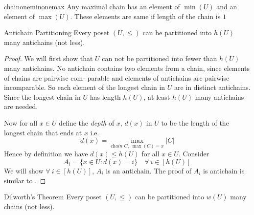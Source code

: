 \begin{lemma}{}{chainoneminonemax}
	Any maximal chain has an element of $\min(U)$ and an element of $\max(U)$. These elements are same if length of the chain is $1$
\end{lemma}
\begin{Theorem}{Antichain Partitioning}{}
	Every poset $(U,\leq )$ can be partitioned into $h(U)$ many antichains (not less). 
\end{Theorem}
\begin{proof}
	We will first show that $U$ can not be partitioned into fewer than $h(U)$ many antichains. No antichain contains two elements from a chain,  since elements of chains are pairwise com-
	parable and elements of antichains are pairwise incomparable. So each element of the longest chain in $U$ are in distinct antichains. Since the longest chain in $U$ has length $h(U)$, at least $h(U)$ many antichains are needed.
	
	Now for all $x\in U$ define the \textit{depth} of $x$, $d(x)$ in $U$ to be the length of the longest chain that ends at $x$ i.e. $$d(x)=\max\limits_{\textit{chain $C$},\; \max(C)=x}|C|$$Hence by definition we have $d(x)\leq h(U)$ for all $x\in U$. Consider $$A_i=\{x\in U\colon d(x)=i\}\quad\forall\ i\in[h(U)]$$We will show $\forall\ i\in[h(U)]$, $A_i$ is an antichain. The proof of $A_i$ is antichain is similar to .
\end{proof}
\begin{Theorem}{Dilworth's Theorem}{}
	Every poset $(U,\leq)$ can be partitioned into $w(U)$ many chains (not less).
\end{Theorem}
